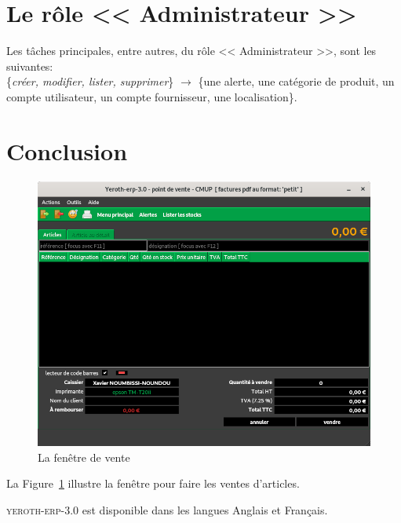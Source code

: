 \documentclass[a4paper, 10pt, twocolumn]{article}
\newcommand{\yeren}{\textsc{yeroth-erp-3.0}\xspace}
\newcommand{\administrateur}{<< Administrateur >>\xspace}
\begin{document}
\vspace{-1.1em}
\section{Le r\^ole \administrateur}\label{tachesadmin}
\vspace{-0.3em}
Les t\^aches principales, entre autres, du r\^ole
\administrateur, sont les suivantes: \\
\{\emph{cr\'eer, modifier, lister, supprimer}\} $\longrightarrow$
\hspace{0.09cm} \{une alerte, une cat\'egorie de produit,
un compte utilisateur, un compte fournisseur, une localisation\}.

\vspace{-1em}
\section{Conclusion}
\vspace{-1em}
\begin{figure}[!htbp]
\centering
\includegraphics[scale=0.33]{../images/yeren-fenetre-caissier.png}
\caption{La fen\^etre de vente}
\label{fig:fenetre-de-vente}
\end{figure}

La Figure~\ref{fig:fenetre-de-vente} illustre la
fen\^etre pour faire les ventes d'articles.

\yeren est disponible dans les langues Anglais et Fran\c{c}ais. 
\end{document}
